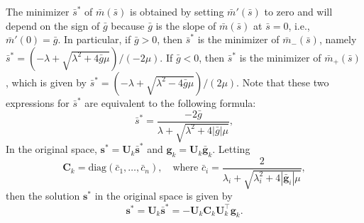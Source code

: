 The minimizer $\bar{s}^*$ of $\bar{m}(\bar{s})$ is obtained by setting $\bar{m}'(\bar{s})$ to zero and will depend on the sign of $\bar{g}$ because $\bar{g}$ is the slope of $\bar{m}(\bar{s})$ at $\bar{s} = 0$, i.e., $\bar{m}'(0) = \bar{g}$.  
In particular,
if $\bar{g} > 0$, then $\bar{s}^*$  is the minimizer of $\bar{m}_-(\bar{s})$,
namely
$\bar{s}^* = (-\lambda + \sqrt{\lambda^2 + 4\bar{g}\mu})/(-2\mu).$
If $\bar{g} < 0$, then $\bar{s}^*$ is the minimizer of $\bar{m}_+(\bar{s})$,
which is given by
$	\bar{s}^* = (-\lambda + \sqrt{\lambda^2 - 4\bar{g}\mu})/(2\mu).$
Note that these two expressions
for $\bar{s}^*$ are equivalent to the following formula:
$$
	\bar{s}^* = \frac{-2\bar{g}}{\lambda + \sqrt{\lambda^2 + 4|\bar{g}|\mu}},
$$
In the original space, $\mathbf{s}^* = \mathbf{U}_k \bar{\mathbf{s}}^*$ and 
$\mathbf{g}_k = \mathbf{U}_k \bar{\mathbf{g}}_k$.
Letting 
\begin{equation}\label{eq:Ck}
	\mathbf{C}_k = \text{diag} (\bar{c}_1, \dots, \bar{c}_n), \quad \text{where \ } \bar{c}_i =  \frac{2}{\lambda_i + \sqrt{\lambda_i^2 + 4|\bar{\mathbf{g}}_i|\mu}},
\end{equation}
then the solution $\mathbf{s}^*$ in the original space is  given by
\begin{equation}\label{eq:sstar}
	\mathbf{s}^* = \mathbf{U}_k \bar{\mathbf{s}}^* =  -\mathbf{U}_k  \mathbf{C}_k \mathbf{U}_k^{\top} \mathbf{g}_k.
\end{equation}




